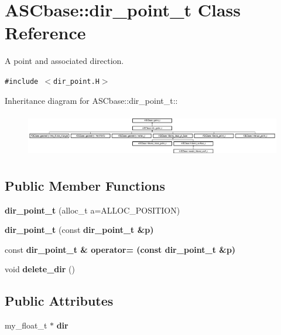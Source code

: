 \section{ASCbase::dir\_\-point\_\-t Class Reference}
\label{classASCbase_1_1dir__point__t}
A point and associated direction.  


{\tt \#include $<$dir\_\-point.H$>$}

Inheritance diagram for ASCbase::dir\_\-point\_\-t::\begin{figure}[H]
\begin{center}
\leavevmode
\includegraphics[height=1.92044cm]{classASCbase_1_1dir__point__t}
\end{center}
\end{figure}
\subsection*{Public Member Functions}
\begin{CompactItemize}
\item 
\textbf{dir\_\-point\_\-t} (alloc\_\-t a=ALLOC\_\-POSITION)\label{classASCbase_1_1dir__point__t_57018723a8991fa7f47cc485ba6f3d86}

\item 
\textbf{dir\_\-point\_\-t} (const \bf{dir\_\-point\_\-t} \&p)\label{classASCbase_1_1dir__point__t_3931e2347f2aee30a6d72ccdb211c7bb}

\item 
const \bf{dir\_\-point\_\-t} \& \textbf{operator=} (const \bf{dir\_\-point\_\-t} \&p)\label{classASCbase_1_1dir__point__t_b45b7d7b83e413955ac14b3ccf2336c4}

\item 
void \textbf{delete\_\-dir} ()\label{classASCbase_1_1dir__point__t_dfb4e224f9037f3e14101f5098d5a6c8}

\end{CompactItemize}
\subsection*{Public Attributes}
\begin{CompactItemize}
\item 
my\_\-float\_\-t $\ast$ \textbf{dir}\label{classASCbase_1_1dir__point__t_7378ba825067f07353f214941ca4a715}

\end{CompactItemize}
